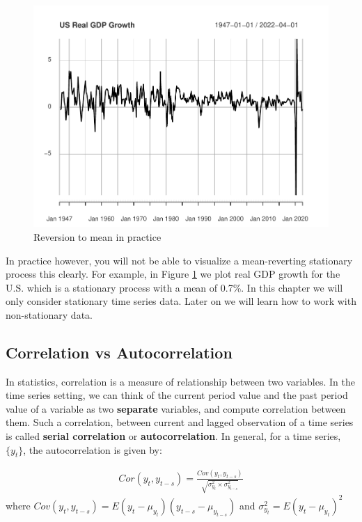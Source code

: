 \documentclass[]{book}
\theoremstyle{definition}
\theoremstyle{definition}
\theoremstyle{definition}
\theoremstyle{remark}
\begin{document}
\begin{figure}

{\centering \includegraphics[width=0.8\linewidth]{bookdown-demo_files/figure-latex/ch6-figure2-1} 

}

\caption{Reversion to mean in practice}\label{fig:ch6-figure2}
\end{figure}

In practice however, you will not be able to visualize a mean-reverting
stationary process this clearly. For example, in Figure
\ref{fig:ch6-figure2} we plot real GDP growth for the U.S. which is a
stationary process with a mean of 0.7\%. In this chapter we will only
consider stationary time series data. Later on we will learn how to work
with non-stationary data.

\hypertarget{correlation-vs-autocorrelation}{%
\subsection{Correlation vs
Autocorrelation}\label{correlation-vs-autocorrelation}}

In statistics, correlation is a measure of relationship between two
variables. In the time series setting, we can think of the current
period value and the past period value of a variable as two
\textbf{separate} variables, and compute correlation between them. Such
a correlation, between current and lagged observation of a time series
is called \textbf{serial correlation} or \textbf{autocorrelation}. In
general, for a time series, \(\{y_t\}\), the autocorrelation is given
by:

\begin{align}
    Cor(y_t,y_{t-s})=\frac{ Cov(y_t,y_{t-s})}{\sqrt{\sigma^2_{y_t} \times \sigma^2_{y_{t-s}}}}
        \end{align} where
\(Cov(y_t,y_{t-s})= E(y_t-\mu_{y_t})(y_{t-s}-\mu_{y_{t-s}})\) and
\(\sigma^2_{y_t}=E(y_t-\mu_{y_t})^2\)
\end{document}
